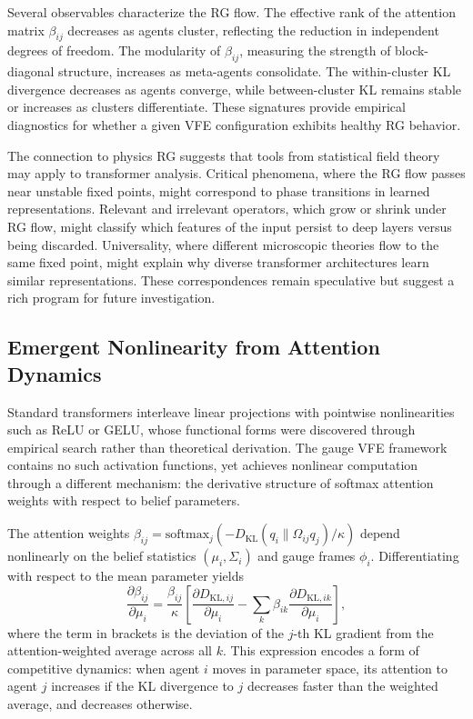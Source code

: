 \documentclass[twoside,11pt]{article}
\begin{document}
Several observables characterize the RG flow. The effective rank of the attention matrix $\beta_{ij}$ decreases as agents cluster, reflecting the reduction in independent degrees of freedom. The modularity of $\beta_{ij}$, measuring the strength of block-diagonal structure, increases as meta-agents consolidate. The within-cluster KL divergence decreases as agents converge, while between-cluster KL remains stable or increases as clusters differentiate. These signatures provide empirical diagnostics for whether a given VFE configuration exhibits healthy RG behavior.

The connection to physics RG suggests that tools from statistical field theory may apply to transformer analysis. Critical phenomena, where the RG flow passes near unstable fixed points, might correspond to phase transitions in learned representations. Relevant and irrelevant operators, which grow or shrink under RG flow, might classify which features of the input persist to deep layers versus being discarded. Universality, where different microscopic theories flow to the same fixed point, might explain why diverse transformer architectures learn similar representations. These correspondences remain speculative but suggest a rich program for future investigation.

\subsection{Emergent Nonlinearity from Attention Dynamics}

Standard transformers interleave linear projections with pointwise nonlinearities such as ReLU or GELU, whose functional forms were discovered through empirical search rather than theoretical derivation. The gauge VFE framework contains no such activation functions, yet achieves nonlinear computation through a different mechanism: the derivative structure of softmax attention weights with respect to belief parameters.

The attention weights $\beta_{ij} = \mathrm{softmax}_j(-D_{\mathrm{KL}}(q_i \| \Omega_{ij} q_j) / \kappa)$ depend nonlinearly on the belief statistics $(\mu_i, \Sigma_i)$ and gauge frames $\phi_i$. Differentiating with respect to the mean parameter yields
\begin{equation}
\frac{\partial \beta_{ij}}{\partial \mu_i} = \frac{\beta_{ij}}{\kappa} \left[ \frac{\partial D_{\mathrm{KL},ij}}{\partial \mu_i} - \sum_k \beta_{ik} \frac{\partial D_{\mathrm{KL},ik}}{\partial \mu_i} \right],
\label{eq:beta_derivative}
\end{equation}
where the term in brackets is the deviation of the $j$-th KL gradient from the attention-weighted average across all $k$. This expression encodes a form of competitive dynamics: when agent $i$ moves in parameter space, its attention to agent $j$ increases if the KL divergence to $j$ decreases faster than the weighted average, and decreases otherwise.
\end{document}
